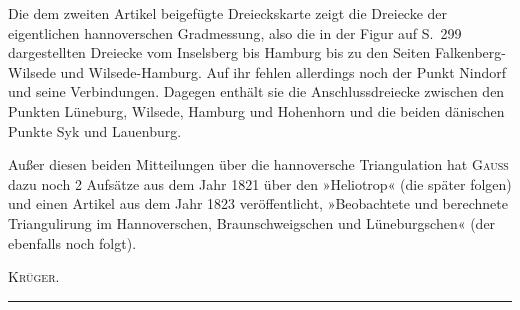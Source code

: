 \par\noindent\hspace*{\parindent}Die dem zweiten Artikel beigefügte Dreieckskarte zeigt die Dreiecke der eigentlichen hannoverschen Gradmessung, also die in der Figur auf S.~299 dargestellten Dreiecke vom Inselsberg bis Hamburg bis zu den Seiten Falkenberg-Wilsede und Wilsede-Hamburg. Auf ihr fehlen allerdings noch der Punkt Nindorf und seine Verbindungen. Dagegen enthält sie die Anschlussdreiecke zwischen den Punkten Lüneburg, Wilsede, Hamburg und Hohenhorn und die beiden dänischen Punkte Syk und Lauenburg.
\par\noindent\hspace*{\parindent}Außer diesen beiden Mitteilungen über die hannoversche Triangulation hat \textsc{Gauss} dazu noch 2 Aufsätze aus dem Jahr 1821 über den »Heliotrop« (die später folgen) und einen Artikel aus dem Jahr 1823 veröffentlicht, »Beobachtete und berechnete Triangulirung im Hannoverschen, Braunschweigschen und Lüneburgschen« (der ebenfalls noch folgt).
\par\noindent\hfill\textsc{Krüger}.\par
\endgroup
\begin{center}\rule{.16\linewidth}{.4pt}\end{center}
